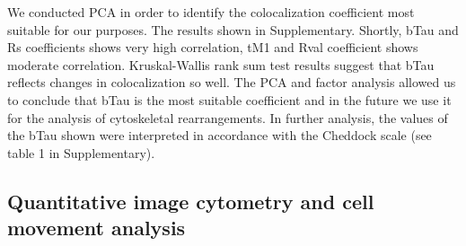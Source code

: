 \documentclass[alpha-refs]{wiley-article}
\begin{document}
We conducted PCA in order to identify the colocalization coefficient most suitable for our purposes.
The results shown in Supplementary.
Shortly, bTau and Rs coefficients shows very high correlation, tM1 and Rval coefficient shows moderate correlation.
Kruskal-Wallis rank sum test results suggest that bTau reflects changes in colocalization so well.
The PCA and factor analysis allowed us to conclude that bTau is the most suitable coefficient and in the future we use it for the analysis of cytoskeletal rearrangements.
In further analysis, the values of the bTau shown were interpreted in accordance with the Cheddock scale (see table 1 in Supplementary).

\subsection{Quantitative image cytometry and cell movement analysis}
\end{document}
